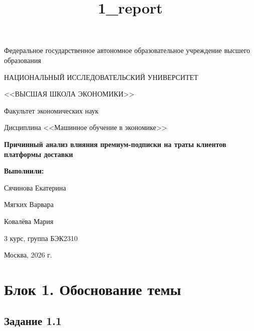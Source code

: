 \documentclass[11pt]{article}
\title{1\_report}
\begin{document}
    
    \begin{titlepage}
    \thispagestyle{empty}
    \begin{center}
    {\large Федеральное государственное автономное образовательное учреждение высшего образования\par}
    \vspace{0.5em}
    {\Large НАЦИОНАЛЬНЫЙ ИССЛЕДОВАТЕЛЬСКИЙ УНИВЕРСИТЕТ\par}
    {\Large <<ВЫСШАЯ ШКОЛА ЭКОНОМИКИ>>\par}
    \vspace{0.8em}
    {\large Факультет экономических наук\par}
    \vspace{0.5em}
    {\large Дисциплина <<Машинное обучение в экономике>>\par}
    \vfill
    {\LARGE\bfseries Причинный анализ влияния премиум-подписки на траты клиентов платформы доставки\par}
    \end{center}
    \vfill
    \begin{flushright}
    {\large\bfseries Выполнили:\par}
    {\large Сячинова Екатерина\par}
    {\large Мягких Варвара\par}
    {\large Ковалёва Мария\par}
    \vspace{0.5em}
    {\large 3 курс, группа БЭК2310\par}
    \end{flushright}
    \vfill
    \begin{center}
    {\large Москва, 2026 г.\par}
    \end{center}
    \end{titlepage}

    \pagestyle{plain}
    \tableofcontents
    \clearpage
    
    

    
    \section{Блок 1. Обоснование
темы}\label{ux431ux43bux43eux43a-1.-ux43eux431ux43eux441ux43dux43eux432ux430ux43dux438ux435-ux442ux435ux43cux44b}

\subsection{Задание 1.1}\label{ux437ux430ux434ux430ux43dux438ux435-1.1}
\end{document}
